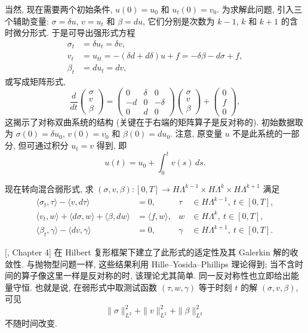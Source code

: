 {当然, 现在需要两个初始条件, $u(0)=u_0$ 和 $u_t(0)=v_0$. 为求解此问题, 引入三个辅助变量: $\sigma=\delta u$, $v=u_t$ 和 $\beta=du$, 它们分别是次数为 $k-1$, $k$ 和 $k+1$ 的含时微分形式. 于是可导出强形式方程}
\[
\begin{aligned}
\sigma_t&=\delta u_t=\delta v,\\
v_t&=u_{tt}=-(\delta d+d\delta)u+f=-\delta\beta-d\sigma+f,\\
\beta_t&=du_t=dv,
\end{aligned}
\]
{或写成矩阵形式,}
\[
\frac d{dt}\begin{pmatrix}\sigma\\v\\\beta\end{pmatrix}=
\begin{pmatrix}0&\delta&0\\-d&0&-\delta\\0&d&0\end{pmatrix}
\begin{pmatrix}\sigma\\v\\\beta\end{pmatrix}+\begin{pmatrix}0\\f\\0\end{pmatrix},
\]
{这揭示了对称双曲系统的结构 (关键在于右端的矩阵算子是反对称的). 初始数据取为 $\sigma(0)=\delta u_0$, $v(0)=v_0$ 和 $\beta(0)=du_0$. 注意, 原变量 $u$ 不是此系统的一部分, 但可通过积分 $u_t=v$ 得到, 即}
\[
u(t)=u_0+\int_0^t v(s)\,ds.
\]

{现在转向混合弱形式, 求 $(\sigma,v,\beta):[0,T]\to H\Lambda^{k-1}\times H\Lambda^k\times H\Lambda^{k+1}$ 满足}
\begin{equation}\label{eq:hodge-wave-weak-formulation}
\begin{aligned}
\langle\sigma_t,\tau\rangle-\langle v,d\tau\rangle&=0,&\tau&\in H\Lambda^{k-1},\ t\in[0,T],\\
\langle v_t,w\rangle+\langle d\sigma,w\rangle+\langle\beta,dw\rangle&=\langle f,w\rangle,&w&\in H\Lambda^k,\ t\in[0,T],\\
\langle\beta_t,\gamma\rangle-\langle dv,\gamma\rangle&=0,&\gamma&\in H\Lambda^{k+1},\ t\in[0,T].
\end{aligned}
\end{equation}

{[, Chapter 4] 在 Hilbert 复形框架下建立了此形式的适定性及其 Galerkin 解的收敛性. 与抛物型问题一样, 这些结果利用 Hille–Yosida–Phillips 理论得到; 当不含时间的算子像这里一样是反对称的时, 该理论尤其简单. 同一反对称性也立即给出能量守恒. 也就是说, 在弱形式中取测试函数 $(\tau,w,\gamma)$ 等于时刻 $t$ 的解 $(\sigma,v,\beta)$, 可见}
\[
\|\sigma\|_{L^2}^2+\|v\|_{L^2}^2+\|\beta\|_{L^2}^2
\]
{不随时间改变.}
